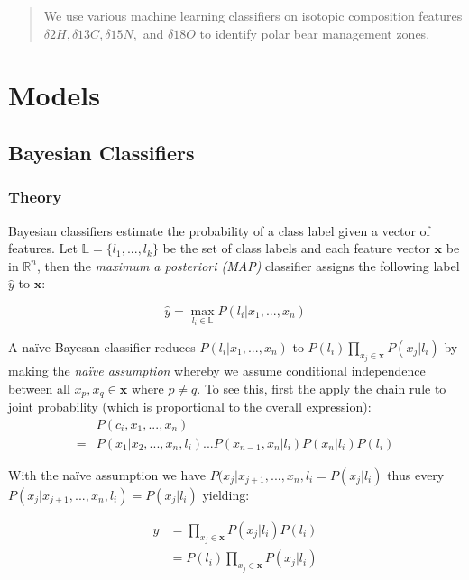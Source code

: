 \documentclass[12pt]{article}
\begin{document}
\maketitle

\begin{abstract}

We use various machine learning classifiers on isotopic composition features $\delta2H, \delta13C, \delta15N,$ and $\delta18O$ to identify polar bear management zones. 

\end{abstract}

\section{Models}

\subsection{Bayesian Classifiers}

\subsubsection{Theory}

Bayesian classifiers estimate the  probability of a class label given a vector of features. Let $\mathbb{L} = \{ l_1, ..., l_k \}$ be the set of class labels and each feature vector $\mathbf{x}$ be in $\mathbb{R}^n$, then the \textit{maximum a posteriori (MAP)} classifier assigns the following label $\hat{y}$ to $\mathbf{x}$:

$$
\hat{y} = \max_{l_i \in \mathbb{L}} P(l_i|x_1, ..., x_n)
$$

A naïve Bayesan classifier reduces $P(l_i|x_1, ..., x_n)$ to $P(l_i)\prod_{x_j \in \mathbf{x}}P(x_j|l_i)$ by making the \textit{naïve assumption} whereby we assume conditional independence between all $x_p, x_q \in \mathbf{x}$ where $p \neq q$. To see this, first the apply the chain rule to joint probability (which is proportional to the overall expression):
\begin{align*}
&P(c_i, x_1, ..., x_n) \\
= &P(x_1|x_2,..., x_n,l_i)...P(x_{n-1},x_n|l_i)P(x_n|l_i)P(l_i)
\end{align*}

With the naïve assumption we have $P(x_j|x_{j+1}, ..., x_n, l_i = P(x_j|l_i)$ thus every $P(x_j|x_{j+1},...,x_n, l_i) = P(x_j|l_i)$ yielding:

\begin{align*}
\hat{y} &= \prod_{x_j \in \mathbf{x}}P(x_j|l_i)P(l_i) \\
&= P(l_i)\prod_{x_j \in \mathbf{x}}P(x_j|l_i)
\end{align*}
\end{document}
